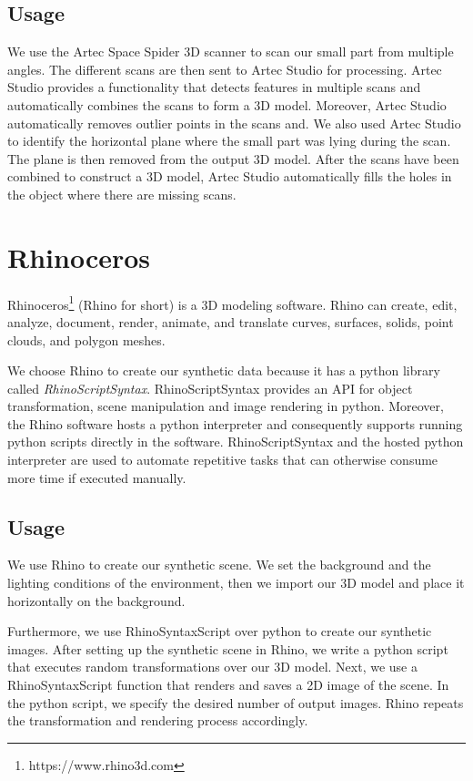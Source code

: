 \subsection{Usage}
We use the Artec Space Spider 3D scanner to scan our small part from multiple angles. The different scans are then sent to Artec Studio for processing. Artec Studio provides a functionality that detects features in multiple scans and automatically combines the scans to form a 3D model. Moreover, Artec Studio automatically removes outlier points in the scans and. We also used Artec Studio to identify the horizontal plane where the small part was lying during the scan. The plane is then removed from the output 3D model. After the scans have been combined to construct a 3D model, Artec Studio automatically fills the holes in the object where there are missing scans.


\section{Rhinoceros}\label{sec:rhino}
Rhinoceros\footnote{https://www.rhino3d.com} (Rhino for short) is a 3D modeling software. Rhino can create, edit, analyze, document, render, animate, and translate curves, surfaces, solids, point clouds, and polygon meshes.

We choose Rhino to create our synthetic data because it has a python library called \textit{RhinoScriptSyntax}. RhinoScriptSyntax provides an API for object transformation, scene manipulation and image rendering in python. Moreover, the Rhino software hosts a python interpreter and consequently supports running python scripts directly in the software. RhinoScriptSyntax and the hosted python interpreter are used to automate repetitive tasks that can otherwise consume more time if executed manually.

\subsection{Usage}
We use Rhino to create our synthetic scene. We set the background and the lighting conditions of the environment, then we import our 3D model and place it horizontally on the background.

Furthermore, we use RhinoSyntaxScript over python to create our synthetic images. After setting up the synthetic scene in Rhino, we write a python script that executes random transformations over our 3D model. Next, we use a RhinoSyntaxScript function that renders and saves a 2D image of the scene. In the python script, we specify the desired number of output images. Rhino repeats the transformation and rendering process accordingly.


